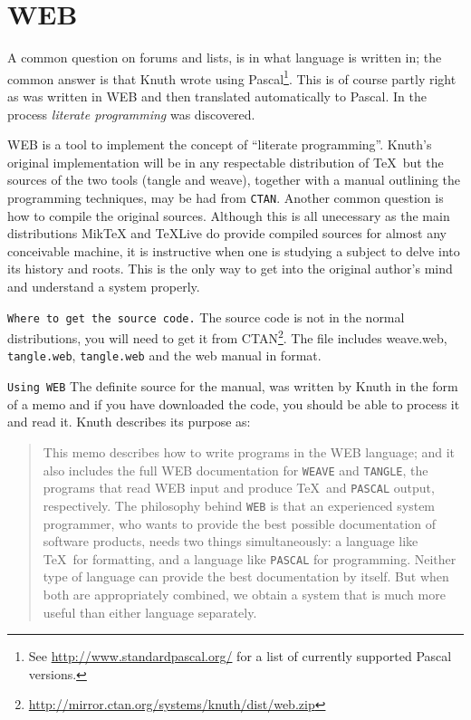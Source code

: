 \def\web{WEB\xspace}
\def\WEB{WEB\xspace}

\chapter{WEB}
\setlength\columnsep{2.03em}

A common question on forums and lists, is in what language is \tex written in; the common  answer is that Knuth wrote \tex using  Pascal\footnote{See \protect\url{http://www.standardpascal.org/} for a list of currently supported Pascal versions.}. This is of course partly right as \text was written in \web and then translated automatically to Pascal. In the process \textit{literate programming} was discovered.

\web is a tool to implement the concept of ``literate programming''. Knuth’s original implementation will be in any respectable distribution of \TeX\, but the sources of the two tools (tangle and weave), together with a manual outlining the programming techniques, may be had from \texttt{CTAN}. Another common question is how to compile the original \tex sources. Although this is all unecessary as the  main distributions MikTeX and TeXLive do provide compiled sources for almost any conceivable machine, it is instructive when one is studying a subject to delve into its history and roots. This is the only way to get into the original author's mind and understand a system properly.

\texttt{Where to get the source code.} The source code is not in the normal distributions, you will need to get it from CTAN\footnote{\protect\url{http://mirror.ctan.org/systems/knuth/dist/web.zip}}. The file includes weave.web, \texttt{tangle.web}, \texttt{tangle.web} and the web manual in  format. 


\texttt{Using \texttt{WEB}} The definite source for the manual, was written by Knuth in the form of a memo and if you have downloaded the code, you should be able to process it and read it. Knuth describes its purpose as:
\begin{quotation}
\noindent This memo describes how to write programs in the
\WEB language; and it also includes the full \WEB documentation for
\texttt{WEAVE} and \texttt{TANGLE}, the programs that read \WEB input and produce
\TeX\ and \texttt{PASCAL} output, respectively. The philosophy behind \texttt{WEB} is
that an experienced system programmer, who wants to provide the best
possible documentation of software products, needs two things
simultaneously:  a language like \TeX\ for formatting, and a language like
\texttt{PASCAL}  for programming. Neither type of language can provide the best
documentation by itself. But when both are appropriately combined, we
obtain a system that is much more useful than either language separately.
\end{quotation}


